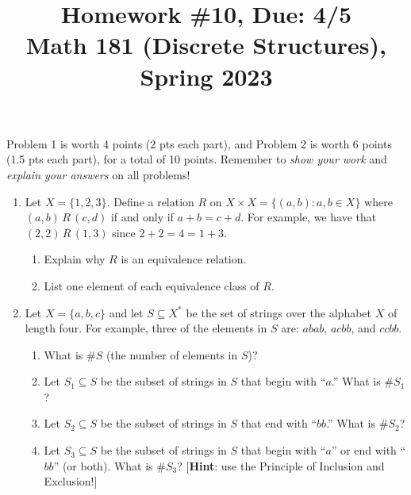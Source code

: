 \documentclass[11pt]{article}
\title{Homework \#10, Due: 4/5 \\Math 181 (Discrete Structures), Spring 2023}
\date{}
\begin{document}
\maketitle

\thispagestyle{empty}

\vspace{-1cm}

Problem 1 is worth 4 points (2 pts each part), and Problem 2 is worth 6 points (1.5 pts each part), for a total of 10 points. Remember to \emph{show your work} and \emph{explain your answers} on all problems!

\begin{enumerate}

\item Let $X= \{1,2,3\}$. Define a relation $R$ on $X \times X = \{(a,b)\colon a, b\in X\}$ where $(a,b) \, R \, (c,d)$ if and only if $a+b = c+d$. For example, we have that $(2,2) \, R \, (1,3)$ since $2+2=4=1+3$.
\begin{enumerate}
\item Explain why $R$ is an equivalence relation.
\item List one element of each equivalence class of $R$.
\end{enumerate}

\item Let $X = \{a,b,c\}$ and let $S\subseteq X^{*}$ be the set of strings over the alphabet $X$ of length four. For example, three of the elements in $S$ are: $abab$, $acbb$, and $ccbb$.
\begin{enumerate}
\item What is $\#S $ (the number of elements in $S$)?
\item Let $S_1 \subseteq S$ be the subset of strings in $S$ that begin with ``$a$.'' What is $\#S_1$?
\item Let $S_2 \subseteq S$ be the subset of strings in $S$ that end with ``$bb$.'' What is $\#S_2$?
\item Let $S_3 \subseteq S$ be the subset of strings in $S$ that begin with ``$a$'' or end with ``$bb$'' (or both). What is $\#S_3$? [{\bf Hint}: use the Principle of Inclusion and Exclusion!]
\end{enumerate}

\end{enumerate}
\end{document}
